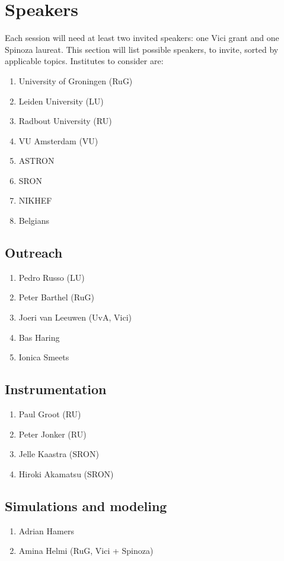\documentclass{article}
\begin{document}
\section{Speakers}
Each session will need at least two invited speakers: one Vici grant and one Spinoza laureat. This section will list possible speakers, to invite, sorted by applicable topics. Institutes to consider are:

\begin{multicols}{2}
    \begin{enumerate}
        \item University of Groningen (RuG)
        \item Leiden University (LU)
        \item Radbout University (RU)
        \item VU Amsterdam (VU)
        \item ASTRON
        \item SRON
        \item NIKHEF
        \item Belgians
    \end{enumerate}
\end{multicols}

\subsection{Outreach}
\begin{enumerate}
    \item Pedro Russo (LU)
    \item Peter Barthel (RuG)
    \item Joeri van Leeuwen (UvA, Vici)
    \item Bas Haring
    \item Ionica Smeets
\end{enumerate}

\subsection{Instrumentation}
\begin{enumerate}
    \item Paul Groot (RU)
    \item Peter Jonker (RU)
    \item Jelle Kaastra (SRON)
    \item Hiroki Akamatsu (SRON)
\end{enumerate}

\subsection{Simulations and modeling}
\begin{enumerate}
    \item Adrian Hamers
    \item Amina Helmi (RuG, Vici + Spinoza)
\end{enumerate}
\end{document}
